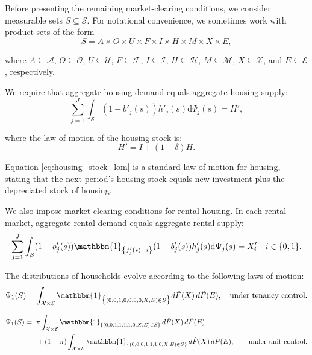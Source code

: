 \documentclass[parskip=full]{article}
\begin{document}
Before presenting the remaining market-clearing conditions, we consider measurable sets $S \subseteq \mathcal{S}$. For notational convenience, we sometimes work with product sets of the form
\[
S = A \times O \times U \times F \times I \times H \times M \times X \times E,
\]

\noindent where $A \subseteq \mathcal{A}$, $O \subseteq \mathcal{O}$, $U \subseteq \mathcal{U}$, $F \subseteq \mathcal{F}$, $I \subseteq \mathcal{I}$, $H \subseteq \mathcal{H}$, $M \subseteq \mathcal{M}$, $X \subseteq \mathcal{X}$, and $E \subseteq \mathcal{E}$, respectively.

We require that aggregate housing demand equals aggregate housing supply:
\begin{equation}
\label{eq:housing_clearing_condition}
  \sum_{j=1}^J \int_\mathcal{S} (1-b'_{j}(s))h'_{j}(s) \mathrm{d}\Psi_j(s) = H',
\end{equation}

\noindent where the law of motion of the housing stock is: 
\begin{equation}\label{eq:housing_stock_lom}
H'=I+(1-\delta)H.
\end{equation}

\noindent Equation \eqref{eq:housing_stock_lom} is a standard law of motion for housing, stating that the next period's housing stock equals new investment plus the depreciated stock of housing. 

We also impose market-clearing conditions for rental housing. In each rental market, aggregate rental demand equals aggregate rental supply:
\begin{equation}\label{eq:rental_housing_clearing_condition}
  \sum_{j=1}^J \int_\mathcal{S} (1-o'_{j}(s))\mathbbm{1}_{\left\{f'_{j}(s)=i\right\}}(1-b'_{j}(s))h'_{j}(s) \mathrm{d}\Psi_j(s) = X'_{i} \quad i \in \{0,1\}.
\end{equation}

The distributions of households evolve according to the following laws of motion:
\begin{equation}\label{eq:lom1}
\Psi_{1}(S) = \int_{\mathcal{X} \times \mathcal{E}} \mathbbm{1}_{\big\{ (0,0,1,0,0,0,0,X,E) \in S \big\}} d\hat{F}(X)\, d\tilde{F}(E), \quad \text{under tenancy control.}
\end{equation}

\begin{equation}\label{eq:lom1_2}
\begin{aligned}
\Psi_{1}(S)={}&\;\pi \int_{\mathcal{X}\times\mathcal{E}}
\mathbbm{1}_{\{(0,0,1,1,1,1,0,X,E)\in S\}}\, d\hat F(X)\, d\tilde F(E)\\&\;+(1-\pi)\int_{\mathcal{X}\times\mathcal{E}}
\mathbbm{1}_{\{(0,0,0,1,1,1,0,X,E)\in S\}}\, d\hat F(X)\, d\tilde F(E),\qquad \text{under unit control.}
\end{aligned}
\end{equation}
\end{document}
